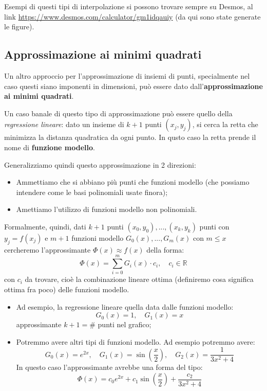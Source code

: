 \documentclass[a4paper,11pt]{article}
\begin{document}
Esempi di questi tipi di interpolazione si possono trovare sempre su Desmos, al link \url{https://www.desmos.com/calculator/gm1idqauiy} (da qui sono state generate le figure).

\subsection{Approssimazione ai minimi quadrati}
Un altro approccio per l'approssimazione di insiemi di punti, specialmente nel caso questi siano imponenti in dimensioni, può essere dato dall'\textbf{approssimazione ai minimi quadrati}.

Un caso banale di questo tipo di approssimazione può essere quello della \textit{regressione lineare}: dato un insieme di $k + 1$ punti $(x_j, y_j)$, si cerca la retta che minimizza la distanza quadratica da ogni punto.
In qusto caso la retta prende il nome di \textbf{funzione modello}.

Generalizziamo quindi questo approssimazione in 2 direzioni:
\begin{itemize}
	\item Ammettiamo che si abbiano più punti che funzioni modello (che possiamo intendere come le basi polinomiali usate finora);
	\item Amettiamo l'utilizzo di funzioni modello non polinomiali.
\end{itemize}

Formalmente, quindi, dati $k + 1$ punti $(x_0, y_0), ..., (x_k, y_k)$ punti con $y_j = f(x_j)$ e $m + 1$ funzioni modello $G_0(x), ..., G_m(x)$ con $m \leq x$ cercheremo l'approssimante $\Phi(x) \approx f(x)$ della forma:
$$
\Phi(x) = \sum_{i = 0}^m G_i(x) \cdot c_i, \quad c_i \in \mathbb{R}
$$
con $c_i$ da trovare, cioè la combinazione lineare ottima (definiremo cosa significa ottima fra poco) delle funzioni modello.

\begin{itemize}
	\item 
Ad esempio, la regressione lineare quella data dalle funzioni modello:
$$
G_0(x) = 1, \quad G_1(x) = x
$$
approssimante $k + 1 = \#$ punti nel grafico;
\item Potremmo avere altri tipi di funzioni modello.
Ad esempio potremmo avere:
	$$
G_0(x) = e^{2x}, \quad G_1(x) = \sin\left( \frac{x}{2} \right), \quad G_2(x) = \frac{1}{3x^2 + 4}
$$
In questo caso l'approssimante avrebbe una forma del tipo:
$$
\Phi(x) = c_0 e^{2x} + c_1 \sin \left( \frac{x}{2} \right) + \frac{c_2}{3x^2 + 4}
$$
\end{itemize}
\end{document}
